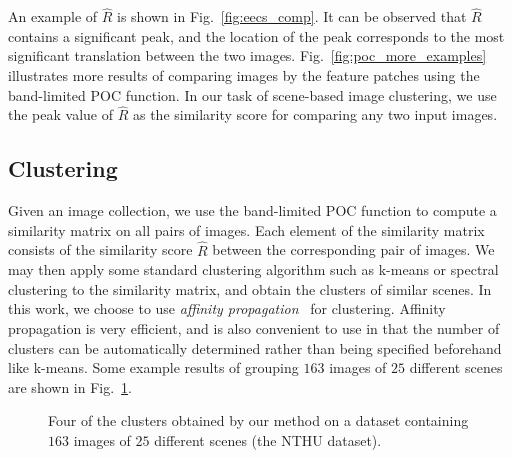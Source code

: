 \documentclass[conference]{IEEEtran}
\begin{document}
An example of $\hat{R}$ is shown in Fig.~\ref{fig:eecs_comp}. It can be observed that $\hat{R}$ contains a significant peak, and the location of the peak corresponds to the most significant translation between the two images. Fig.~\ref{fig:poc_more_examples} illustrates more results of comparing images by the feature patches using the band-limited POC function. In our task of scene-based image clustering, we use the peak value of $\hat{R}$ as the similarity score for comparing any two input images.





\subsection{Clustering}

Given an image collection, we use the band-limited POC function to compute a similarity matrix on all pairs of images. Each element of the similarity matrix consists of the similarity score $\hat{R}$ between the corresponding pair of images. We may then apply some standard clustering algorithm such as k-means or spectral clustering to the similarity matrix, and obtain the clusters of similar scenes. In this work, we choose to use {\em affinity propagation}~\cite{FreyD05} for clustering. Affinity propagation is very efficient, and is also convenient to use in that the number of clusters can be automatically determined rather than being specified beforehand like k-means. Some example results of grouping $163$ images of $25$ different scenes are shown in Fig.~\ref{fig:clusters}.


\begin{figure}
\centering
{}
\caption{Four of the clusters obtained by our method on a dataset containing $163$ images of $25$ different scenes (the {\sf NTHU} dataset).}
\label{fig:clusters}
\end{figure}
\end{document}
